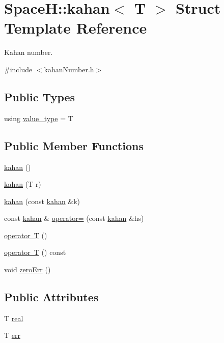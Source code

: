 \hypertarget{struct_space_h_1_1kahan}{}\section{SpaceH\+:\+:kahan$<$ T $>$ Struct Template Reference}
\label{struct_space_h_1_1kahan}


Kahan number.  




{\ttfamily \#include $<$kahan\+Number.\+h$>$}

\subsection*{Public Types}
\begin{DoxyCompactItemize}
\item 
using \mbox{\hyperlink{struct_space_h_1_1kahan_ae2e0e0627b003662802b12bf6b02f551}{value\+\_\+type}} = T
\end{DoxyCompactItemize}
\subsection*{Public Member Functions}
\begin{DoxyCompactItemize}
\item 
\mbox{\hyperlink{struct_space_h_1_1kahan_a97b3bd761defb5ed56ec1693822a23aa}{kahan}} ()
\item 
\mbox{\hyperlink{struct_space_h_1_1kahan_a0ba659734c4a20fbb307cfb26b871585}{kahan}} (T r)
\item 
\mbox{\hyperlink{struct_space_h_1_1kahan_a52479b2b99e2fc5174552eee059c70ea}{kahan}} (const \mbox{\hyperlink{struct_space_h_1_1kahan}{kahan}} \&k)
\item 
const \mbox{\hyperlink{struct_space_h_1_1kahan}{kahan}} \& \mbox{\hyperlink{struct_space_h_1_1kahan_ac37afdaf89b9767870b8b67a7e62ab4b}{operator=}} (const \mbox{\hyperlink{struct_space_h_1_1kahan}{kahan}} \&hs)
\item 
\mbox{\hyperlink{struct_space_h_1_1kahan_ac818dc8e06b0df33793f3a166dcacdd7}{operator T}} ()
\item 
\mbox{\hyperlink{struct_space_h_1_1kahan_aac0531dd242d8da70ecd34789bc29282}{operator T}} () const
\item 
void \mbox{\hyperlink{struct_space_h_1_1kahan_a2e4b2e324e738455f7ff545137993a4a}{zero\+Err}} ()
\end{DoxyCompactItemize}
\subsection*{Public Attributes}
\begin{DoxyCompactItemize}
\item 
T \mbox{\hyperlink{struct_space_h_1_1kahan_a34f95db4f173e2136fb49e679b6816be}{real}}
\item 
T \mbox{\hyperlink{struct_space_h_1_1kahan_abd8853c83c20e2eb13b602032a55bd2a}{err}}
\end{DoxyCompactItemize}
